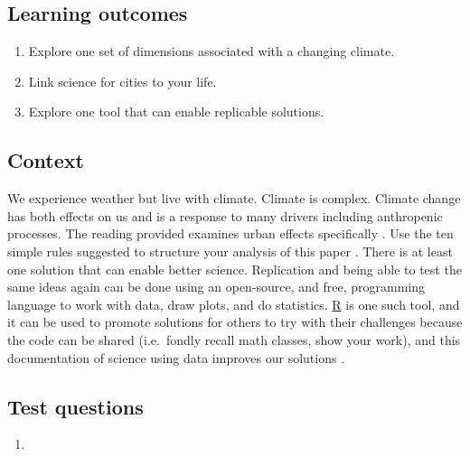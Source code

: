 \documentclass[
]{book}
\providecommand{\tightlist}{%
  \setlength{\itemsep}{0pt}\setlength{\parskip}{0pt}}
\begin{document}
\hypertarget{learning-outcomes-1}{%
\subsection*{Learning outcomes}\label{learning-outcomes-1}}

\begin{enumerate}
\def\labelenumi{\arabic{enumi}.}
\tightlist
\item
  Explore one set of dimensions associated with a changing climate.
\item
  Link science for cities to your life.\\
\item
  Explore one tool that can enable replicable solutions.
\end{enumerate}

\hypertarget{context}{%
\subsection*{Context}\label{context}}

We experience weather but live with climate. Climate is complex. Climate change has both effects on us and is a response to many drivers including anthropenic processes. The reading provided examines urban effects specifically \citep{RN5995}. Use the ten simple rules suggested to structure your analysis of this paper \citep{RN6861}. There is at least one solution that can enable better science. Replication and being able to test the same ideas again can be done using an open-source, and free, programming language to work with data, draw plots, and do statistics. \href{https://www.r-project.org}{R} is one such tool, and it can be used to promote solutions for others to try with their challenges because the code can be shared (i.e.~fondly recall math classes, show your work), and this documentation of science using data improves our solutions \citep{RN4523}.

\hypertarget{test-questions}{%
\subsection*{Test questions}\label{test-questions}}

\begin{enumerate}
\def\labelenumi{\arabic{enumi}.}
\tightlist
\item
\end{enumerate}
\end{document}
